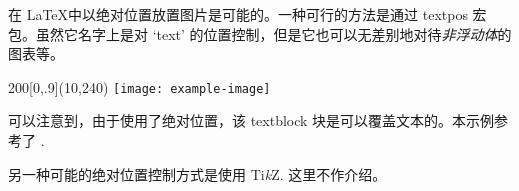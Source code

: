 在 \LaTeX 中以绝对位置放置图片是可能的。一种可行的方法是通过 textpos 宏包。虽然它名字上是对 `text' 的位置控制，但是它也可以无差别地对待\emph{非浮动体}的图表等。

\begin{vertlst}
\zhlipsum[2][name=nanshanjing]
\begin{textblock}{200}[0,.9](10,240)
\texttt{[image: example-image]}
\end{textblock}
\zhlipsum[3][name=nanshanjing]
\end{vertlst}

可以注意到，由于使用了绝对位置，该 textblock 块是可以覆盖文本的。本示例参考了 \cite{stackexchange-abspos}.

另一种可能的绝对位置控制方式是使用 Ti\emph{k}Z. 这里不作介绍。